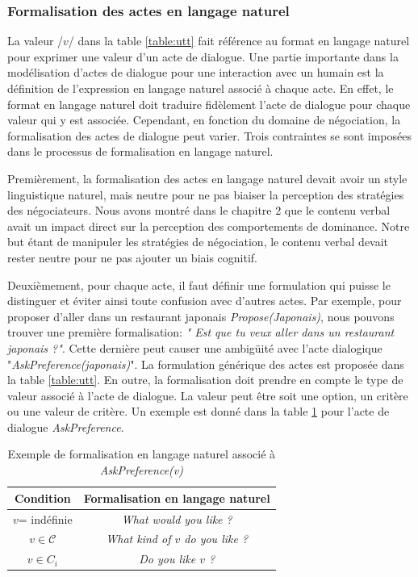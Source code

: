 \subsubsection{Formalisation des actes en langage naturel}
	\label{sec:formalisation}
	La valeur /$v$/ dans la table \ref{table:utt} fait référence au format en langage naturel pour exprimer une valeur d'un acte de dialogue.
	Une partie importante dans la modélisation d'actes de dialogue pour une interaction avec un humain est la définition de l'expression en langage naturel associé à chaque acte. En effet, le format en langage naturel doit traduire fidèlement l'acte de dialogue pour chaque valeur qui y est associée.
	Cependant, en fonction du domaine de négociation, la formalisation des actes de dialogue peut varier. Trois contraintes se sont imposées dans le processus de formalisation en langage naturel. 
	
	Premièrement, la formalisation des actes en langage naturel devait avoir un style linguistique naturel, mais neutre pour ne pas biaiser la perception des stratégies des négociateurs. Nous avons montré dans le chapitre 2 que le contenu verbal avait un impact direct sur la perception des comportements de dominance. 
	Notre but étant de manipuler les stratégies de négociation, le contenu verbal devait rester neutre pour ne pas ajouter un biais cognitif.
	
	Deuxièmement, pour chaque acte, il faut définir une formulation qui puisse le distinguer et éviter ainsi toute confusion avec d'autres actes. Par exemple, pour proposer d'aller dans un restaurant japonais \emph{Propose(Japonais)}, nous pouvons trouver une première formalisation: \emph{" Est que tu veux aller dans un restaurant japonais ?"}. Cette dernière peut causer une ambigüité avec l'acte dialogique "\textit{AskPreference(japonais)}". 
	La formulation générique des actes est proposée dans la table \ref{table:utt}. En outre, la formalisation doit prendre en compte le type de valeur associé à l'acte de dialogue. La valeur peut être soit une option, un critère ou une valeur de critère. Un exemple est donné dans la table \ref{tab:askEx} pour l'acte de dialogue \emph{AskPreference}.


\begin{table} [h]
	\begin{tabular} {c c}
		\hline
		\hline
		\textbf{Condition} &\textbf{ Formalisation en langage naturel }\\
		\hline
		$v$= indéfinie & \textit{What would you like ?} \\
		\hline
		$v \in \mathcal{C}$ & \textit{What kind of $v$ do you like ?} \\
		\hline
		$ v \in C_i $ & \textit{Do you like $v$ ?} \\
		\hline
		\hline
		
	\end{tabular}
	\caption{\label{tab:askEx} Exemple de formalisation en langage naturel associé à \emph{AskPreference(v)}}
\end{table}

